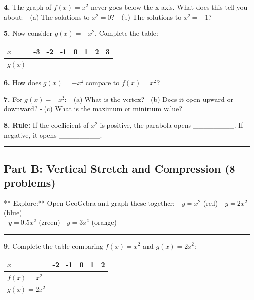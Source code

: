 \documentclass[
  11pt,
]{article}
\begin{document}
\textbf{4.} The graph of \(f(x) = x^2\) never goes below the x-axis.
What does this tell you about: - (a) The solutions to \(x^2 = 0\)? - (b)
The solutions to \(x^2 = -1\)?

\textbf{5.} Now consider \(g(x) = -x^2\). Complete the table:

\begin{longtable}[]{@{}llllllll@{}}
\toprule\noalign{}
\(x\) & -3 & -2 & -1 & 0 & 1 & 2 & 3 \\
\midrule\noalign{}
\endhead
\bottomrule\noalign{}
\endlastfoot
\(g(x)\) & & & & & & & \\
\end{longtable}

\textbf{6.} How does \(g(x) = -x^2\) compare to \(f(x) = x^2\)?

\textbf{7.} For \(g(x) = -x^2\): - (a) What is the vertex? - (b) Does it
open upward or downward? - (c) What is the maximum or minimum value?

\textbf{8.} \textbf{Rule:} If the coefficient of \(x^2\) is positive,
the parabola opens \_\_\_\_\_\_\_\_. If negative, it opens
\_\_\_\_\_\_\_\_.

\begin{center}\rule{0.5\linewidth}{0.5pt}\end{center}

\hypertarget{part-b-vertical-stretch-and-compression-8-problems}{%
\subsection{Part B: Vertical Stretch and Compression (8
problems)}\label{part-b-vertical-stretch-and-compression-8-problems}}

** Explore:** Open GeoGebra and graph these together: - \(y = x^2\)
(red) - \(y = 2x^2\) (blue)\\
- \(y = 0.5x^2\) (green) - \(y = 3x^2\) (orange)

\begin{center}\rule{0.5\linewidth}{0.5pt}\end{center}

\textbf{9.} Complete the table comparing \(f(x) = x^2\) and
\(g(x) = 2x^2\):

\begin{longtable}[]{@{}llllll@{}}
\toprule\noalign{}
\(x\) & -2 & -1 & 0 & 1 & 2 \\
\midrule\noalign{}
\endhead
\bottomrule\noalign{}
\endlastfoot
\(f(x) = x^2\) & & & & & \\
\(g(x) = 2x^2\) & & & & & \\
\end{longtable}
\end{document}
